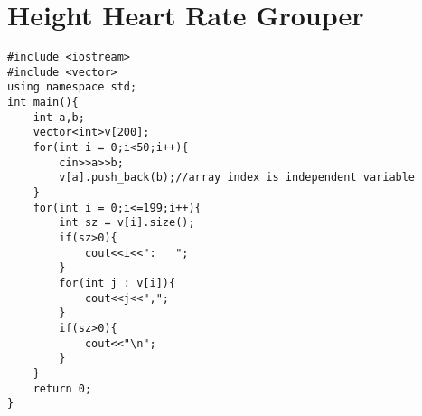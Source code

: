 \chapter[Programs Used]{Height Heart Rate Grouper}
\label{AppendixA}

\begin{verbatim}
#include <iostream>
#include <vector>
using namespace std;
int main(){
    int a,b;
    vector<int>v[200];
    for(int i = 0;i<50;i++){
        cin>>a>>b;
        v[a].push_back(b);//array index is independent variable
    }
    for(int i = 0;i<=199;i++){
        int sz = v[i].size();
        if(sz>0){
            cout<<i<<":   ";
        }
        for(int j : v[i]){
            cout<<j<<",";
        }
        if(sz>0){
            cout<<"\n";
        }
    }
    return 0;
}

\end{verbatim}
